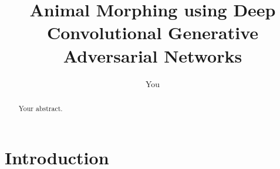 \documentclass[a4paper]{article}
\title{Animal Morphing using Deep Convolutional Generative Adversarial Networks}
\author{
	You
}
\begin{document}
\maketitle

\begin{abstract}
Your abstract.
\end{abstract}

\section{Introduction}
\end{document}
